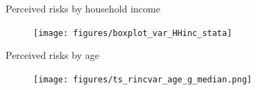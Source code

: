 \documentclass{beamer}
\begin{document}
\begin{frame}{Perceived risks by household income}
\begin{figure}
	\centering
	\label{boxplot_hhinc}
	\texttt{[image: figures/boxplot\_var\_HHinc\_stata]}
\end{figure}
\end{frame}

\begin{frame}{Perceived risks by age}
	\begin{figure}[ht]
		\label{ts_incvar_age_g_mean}
		\centering
		\texttt{[image: figures/ts\_rincvar\_age\_g\_median.png]}
	\end{figure}
\end{frame}

\end{document}
